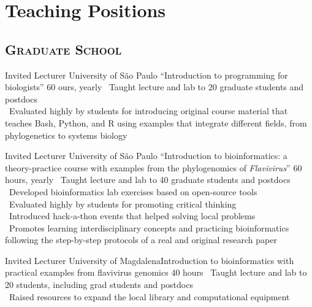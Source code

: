 \section{Teaching Positions}

\vspace{.5em}
	\subsection{\textsc{Graduate School}}
\vspace{.5em}

	{Invited Lecturer}
	{University of São Paulo}
	{``Introduction to programming for biologists''}
	{60 ours, yearly}
	{
		\textbullet~Taught lecture and lab to 20 graduate students and postdocs\\
		\textbullet~Evaluated highly by students for introducing original course material that teaches Bash, Python, and R using examples that integrate different fields, from phylogenetics to systems biology
	}

\vspace{.5em}

	{Invited Lecturer}
	{University of São Paulo}
	{``Introduction to bioinformatics: a theory-practice course with examples from the phylogenomics of \emph{Flavivirus}''}
	{60 hours, yearly}
	{
		\textbullet~Taught lecture and lab to 40 graduate students and postdocs\\
		\textbullet~Developed bioinformatics lab exercises based on open-source tools\\
		\textbullet~Evaluated highly by students for promoting critical thinking\\
		\textbullet~Introduced hack-a-thon events that helped solving local problems\\
		\textbullet~Promotes learning interdisciplinary concepts and practicing bioinformatics following the step-by-step protocols of a real and original research paper
	}

\vspace{.5em}

	{Invited Lecturer}
	{University of Magdalena}{Introduction to bioinformatics with practical examples from flavivirus genomics}
	{40 hours}
	{
		\textbullet~Taught lecture and lab to 20 students, including grad students and postdocs\\
		\textbullet~Raised resources to expand the local library and computational equipment
	}

